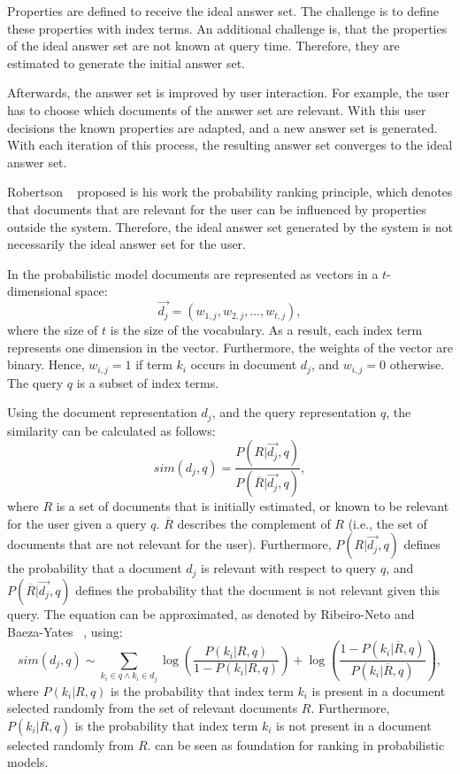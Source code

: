 Properties are defined to receive the ideal answer set. The challenge is to define these properties with index terms. An additional challenge is, that the properties of the ideal answer set are not known at query time. Therefore, they are estimated to generate the initial answer set.

Afterwards, the answer set is improved by user interaction. For example, the user has to choose which documents of the answer set are relevant. With this user decisions the known properties are adapted, and a new answer set is generated. With each iteration of this process, the resulting answer set converges to the ideal answer set. 

Robertson ~\cite{robertson-the-1997} proposed is his work the probability ranking principle, which denotes that documents that are relevant for the user can be influenced by properties outside the system. Therefore, the ideal answer set generated by the system is not necessarily the ideal answer set for the user.

In the probabilistic model documents are represented as vectors in a $t$-dimensional space:
\begin{equation}
  \vec{d_j} = (w_{1, j}, w_{2, j}, \dots, w_{t, j}),
\end{equation}
where the size of $t$ is the size of the vocabulary. As a result, each index term represents one dimension in the vector. Furthermore, the weights of the vector are binary. Hence, $w_{i, j} = 1$ if term $k_i$ occurs in document $d_j$, and $w_{i, j} = 0$ otherwise. The query $q$ is a subset of index terms.

Using the document representation $d_j$, and the query representation $q$, the similarity can be calculated as follows:
\begin{equation}
  sim(d_{j}, q) = \frac{P(R|\vec{d_j}, q)}{P(\overline{R}|\vec{d_j}, q)},
\end{equation}
where $R$ is a set of documents that is initially estimated, or known to be relevant for the user given a query $q$. $\overline{R}$ describes the complement of $R$ (i.e., the set of documents that are not relevant for the user). Furthermore, $P(R|\vec{d_j}, q)$ defines the probability that a document $d_j$ is relevant with respect to query $q$, and $P(\overline{R}|\vec{d_j}, q)$ defines the probability that the document is not relevant given this query. The equation can be approximated, as denoted by Ribeiro-Neto and Baeza-Yates ~\cite{ModernInvormationRetrieval1999}, using:
\begin{equation}
  \label{similarity_porbabilistic_approx}
  sim(d_{j}, q) \sim \sum_{k_i \in q \wedge k_i \in d_j} \log \left(\frac{P(k_i|R, q)}{1 - P(k_i|R, q)}\right) + \log \left(\frac{1 - P(k_i|\overline{R}, q)}{P(k_i|\overline{R}, q)}\right),
\end{equation}
where $P(k_i|R, q)$ is the probability that index term $k_i$ is present in a document selected randomly from the set of relevant documents $R$. Furthermore, $P(k_i|\overline{R}, q)$ is the probability that index term $k_i$ is not present in a document selected randomly from $R$.  can be seen as foundation for ranking in probabilistic models.

